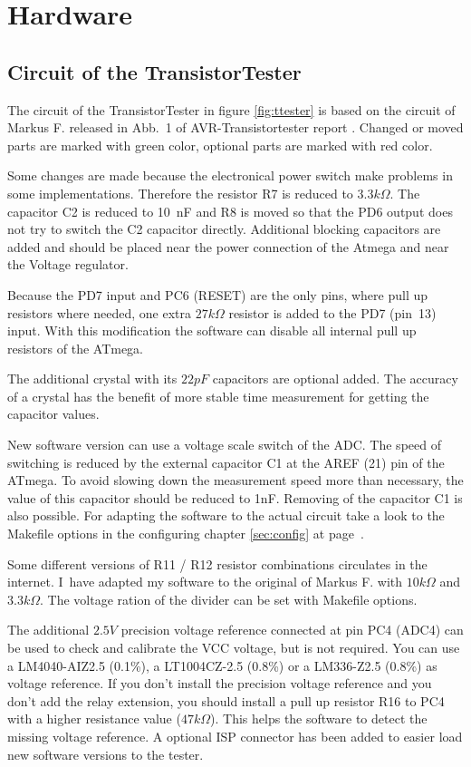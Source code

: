 \chapter{Hardware}

\section{Circuit of the TransistorTester}
\label{sec:hardware}
The circuit of the TransistorTester in figure \ref{fig:ttester} is based on the circuit of
 Markus F. released in Abb.~1 of AVR-Transistortester report \cite{Frejek}.
Changed or moved parts are marked with green color, optional parts are marked with red color.

Some changes are made because the electronical power switch make problems in some implementations.
Therefore the resistor R7 is reduced to \(3.3k\Omega\). The capacitor C2 is reduced to
10~nF and R8 is moved so that the PD6 output does not try to switch the C2 capacitor directly.
 Additional blocking capacitors are added and should be placed
near the power connection of the Atmega and near the Voltage regulator.

Because the PD7 input and PC6 (RESET) are the only pins, where pull up resistors where
needed, one extra \(27k\Omega\) resistor is added to the PD7 (pin~13) input. With this modification
the software can disable all internal pull up resistors of the ATmega.

The additional crystal with its \(22pF\) capacitors are optional added. 
The accuracy of a crystal has the benefit of more stable time measurement for getting the
capacitor values.

New software version can use a voltage scale switch of the ADC. The speed of switching is reduced
by the external capacitor C1 at the AREF (21) pin of the ATmega. To avoid slowing down the
measurement speed more than necessary, the value of this capacitor should be reduced to 1nF.
Removing of the capacitor C1 is also possible.
For adapting the software to the actual circuit take a look to the Makefile options in the
configuring chapter \ref{sec:config} at page~\pageref{sec:config}.

Some different versions of R11 / R12 resistor combinations circulates
in the internet. I~have adapted my software to the original of Markus F. \cite{Frejek} with \(10k\Omega\) and \(3.3k\Omega\).
The voltage ration of the divider can be set with Makefile options.

The additional \(2.5V\) precision voltage reference connected at pin PC4 (ADC4) can be used to
check and calibrate the VCC voltage, but is not required. You can use a LM4040-AIZ2.5 (0.1\%),
a LT1004CZ-2.5 (0.8\%) or a LM336-Z2.5 (0.8\%) as voltage reference.
If you don't install the precision voltage reference and you don't add the relay extension,
you should install a pull up resistor R16 to PC4 with a higher resistance value (\(47k\Omega\)).
This helps the software to detect the missing voltage reference.
A optional ISP connector has been added to easier load new software versions to the tester.


